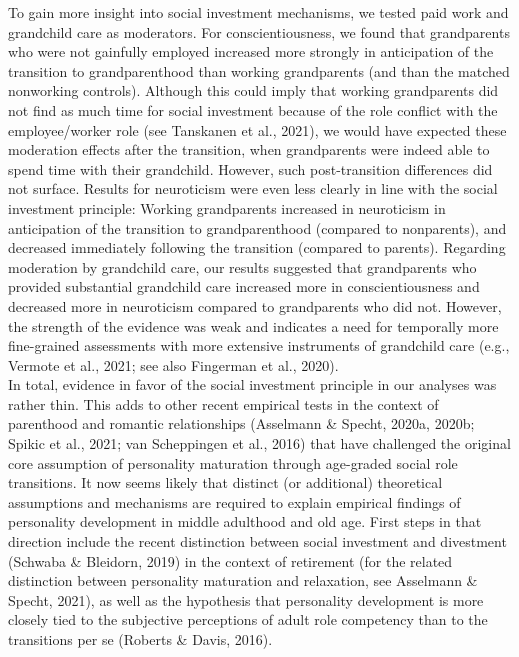 \documentclass[
  english,
  man,floatsintext]{apa7}
\begin{document}
To gain more insight into social investment mechanisms, we tested paid work and grandchild care as moderators. For conscientiousness, we found that grandparents who were not gainfully employed increased more strongly in anticipation of the transition to grandparenthood than working grandparents (and than the matched nonworking controls). Although this could imply that working grandparents did not find as much time for social investment because of the role conflict with the employee/worker role (see Tanskanen et al., 2021), we would have expected these moderation effects after the transition, when grandparents were indeed able to spend time with their grandchild. However, such post-transition differences did not surface. Results for neuroticism were even less clearly in line with the social investment principle: Working grandparents increased in neuroticism in anticipation of the transition to grandparenthood (compared to nonparents), and decreased immediately following the transition (compared to parents). Regarding moderation by grandchild care, our results suggested that grandparents who provided substantial grandchild care increased more in conscientiousness and decreased more in neuroticism compared to grandparents who did not. However, the strength of the evidence was weak and indicates a need for temporally more fine-grained assessments with more extensive instruments of grandchild care (e.g., Vermote et al., 2021; see also Fingerman et al., 2020).\\
In total, evidence in favor of the social investment principle in our analyses was rather thin. This adds to other recent empirical tests in the context of parenthood and romantic relationships (Asselmann \& Specht, 2020a, 2020b; Spikic et al., 2021; van Scheppingen et al., 2016) that have challenged the original core assumption of personality maturation through age-graded social role transitions. It now seems likely that distinct (or additional) theoretical assumptions and mechanisms are required to explain empirical findings of personality development in middle adulthood and old age. First steps in that direction include the recent distinction between social investment and divestment (Schwaba \& Bleidorn, 2019) in the context of retirement (for the related distinction between personality maturation and relaxation, see Asselmann \& Specht, 2021), as well as the hypothesis that personality development is more closely tied to the subjective perceptions of adult role competency than to the transitions per se (Roberts \& Davis, 2016).\\
\end{document}
